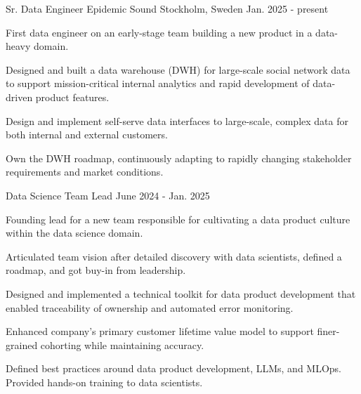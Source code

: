

\begin{cventries}


  \cventry
    {Sr. Data Engineer} %
    {Epidemic Sound} %
    {Stockholm, Sweden} %
    {Jan. 2025 - present} %
    {
    First data engineer on an early-stage team building a new product in a data-heavy domain.
    \vspace{5.0mm}
      \begin{cvitems} %
        \item {Designed and built a data warehouse (DWH) for large-scale social network data to support mission-critical internal analytics and rapid development of data-driven product features.}
        \item {Design and implement self-serve data interfaces to large-scale, complex data for both internal and external customers.}
        \item {Own the DWH roadmap, continuously adapting to rapidly changing stakeholder requirements and market conditions.}
      \end{cvitems}
    }

  \vspace{-1.0mm}
  \cventry
    {Data Science Team Lead} %
    {} %
    {} %
    {June 2024 - Jan. 2025} %
    {
    Founding lead for a new team responsible for cultivating a data product culture within the data science domain.
    \vspace{5.0mm}
      \begin{cvitems} %
        \item {Articulated team vision after detailed discovery with data scientists, defined a roadmap, and got buy-in from leadership. }
        \item {Designed and implemented a technical toolkit for data product development that enabled traceability of ownership and automated error monitoring. }
        \item {Enhanced company's primary customer lifetime value model to support finer-grained cohorting while maintaining accuracy. }
        \item {Defined best practices around data product development, LLMs, and MLOps. Provided hands-on training to data scientists. }
      \end{cvitems}
    }


\end{cventries}
